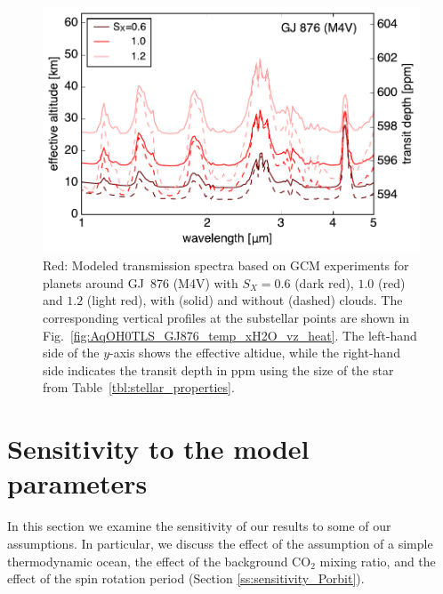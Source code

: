 \documentclass[11pt,numberedappendix,twocolappendix,]{emulateapj}
\begin{document}
\begin{figure}[!h]
    \begin{center}
    \includegraphics[width=\hsize]{fig/transit_GJ876.pdf}
    \end{center}
\caption{Red: Modeled transmission spectra based on GCM experiments for planets around GJ~876 (M4V) with $S_X=0.6$ (dark red), $1.0$ (red) and $1.2$ (light red), with (solid) and without (dashed) clouds. The corresponding vertical profiles at the substellar points are shown in Fig.~\ref{fig:AqOH0TLS_GJ876_temp_xH2O_vz_heat}. The left-hand side of the $y$-axis shows the effective altidue, while the right-hand side indicates the transit depth in ppm using the size of the star from Table~\ref{tbl:stellar_properties}.}
\label{fig:transmission}
\end{figure}


\section{Sensitivity to the model parameters}
\label{s:sensitivity}

In this section we examine the sensitivity of our results to some of our assumptions. 
In particular, we discuss the effect of the assumption of a simple thermodynamic ocean, the effect of the background CO$_2$ mixing ratio, and the effect of the spin rotation period (Section \ref{ss:sensitivity_Porbit}). 



\end{document}
